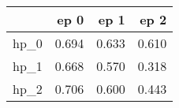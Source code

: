 \begin{tabular}{lrrr}
\toprule
{} &   ep 0 &   ep 1 &   ep 2 \\
\midrule
hp\_0 &  0.694 &  0.633 &  0.610 \\
hp\_1 &  0.668 &  0.570 &  0.318 \\
hp\_2 &  0.706 &  0.600 &  0.443 \\
\bottomrule
\end{tabular}
